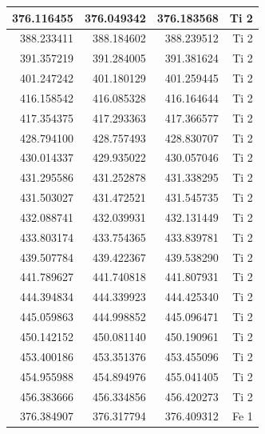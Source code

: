 \documentclass[12pt,oneside,openany,letter]{book}
\begin{document}
\begin{longtable}{|r|r|r|r|}
376.116455          & 376.049342          & 376.183568        & Ti 2          \\ \hline
388.233411        & 388.184602          & 388.239512         & Ti 2          \\ \hline
391.357219          & 391.284005          & 391.381624         & Ti 2          \\ \hline
401.247242          & 401.180129          & 401.259445         & Ti 2          \\ \hline
416.158542          & 416.085328          & 416.164644         & Ti 2          \\ \hline
417.354375          & 417.293363          & 417.366577         & Ti 2          \\ \hline
428.794100          & 428.757493          & 428.830707         & Ti 2          \\ \hline
430.014337          & 429.935022          & 430.057046         & Ti 2          \\ \hline
431.295586          & 431.252878          & 431.338295         & Ti 2          \\ \hline
431.503027          & 431.472521          & 431.545735         & Ti 2          \\ \hline
432.088741          & 432.039931          & 432.131449         & Ti 2          \\ \hline
433.803174          & 433.754365          & 433.839781         & Ti 2          \\ \hline
439.507784          & 439.422367          & 439.538290         & Ti 2          \\ \hline
441.789627          & 441.740818          & 441.807931         & Ti 2          \\ \hline
444.394834          & 444.339923          & 444.425340         & Ti 2          \\ \hline
445.059863          & 444.998852          & 445.096471         & Ti 2          \\ \hline
450.142152          & 450.081140          & 450.190961         & Ti 2          \\ \hline
453.400186          & 453.351376          & 453.455096         & Ti 2          \\ \hline
454.955988          & 454.894976          & 455.041405         & Ti 2          \\ \hline
456.383666          & 456.334856          & 456.420273         & Ti 2          \\ \hline
376.384907                                & 376.317794                               & 376.409312                              & Fe 1                               \\ \hline

\end{longtable}
\end{document}
